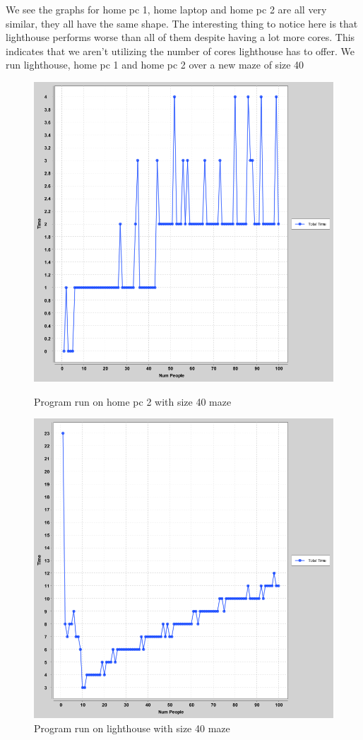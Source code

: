 \documentclass[a4paper, 12pt]{article}
\begin{document}
		We see the graphs for home pc 1, home laptop and home pc 2 are all very similar, they all have the same shape. The interesting thing to notice here is that lighthouse performs worse than all of them despite having a lot more cores. This indicates that we aren't utilizing the number of cores lighthouse has to offer. We run lighthouse, home pc 1 and home pc 2 over a new maze of size 40
		
		\begin{figure}[H]
  				\includegraphics[width=\linewidth]{numpeople-vs-time(homepc2-big)}
  				\caption{Program run on home pc 2 with size 40 maze}
			\endminipage\hfill
  				\includegraphics[width=\linewidth]{numpeople-vs-time(lighthouse-big)}
  				\caption{Program run on lighthouse with size 40 maze}
			\endminipage\hfill
		\end{figure}
		
\end{document}
